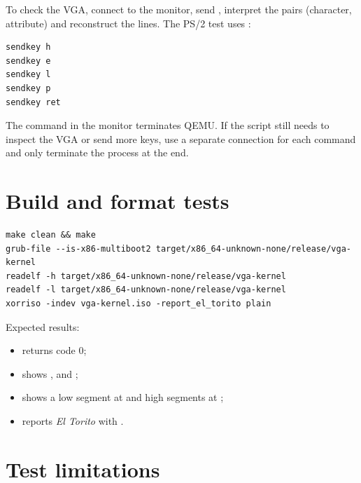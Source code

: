 To check the VGA, connect to the monitor, send
, interpret the pairs (character, attribute) and
reconstruct the lines. The PS/2 test uses :

\begin{lstlisting}[style=shell,caption={Sending keys through the QEMU monitor.},label={lst:sendkey}]
sendkey h
sendkey e
sendkey l
sendkey p
sendkey ret
\end{lstlisting}

\begin{atencao}
The  command in the monitor terminates QEMU. If the script still
needs to inspect the VGA or send more keys, use a separate connection for each
command and only terminate the process at the end.
\end{atencao}

\section{Build and format tests}

\begin{lstlisting}[style=shell,caption={Structural validation commands.},label={lst:testbuild}]
make clean && make
grub-file --is-x86-multiboot2 target/x86_64-unknown-none/release/vga-kernel
readelf -h target/x86_64-unknown-none/release/vga-kernel
readelf -l target/x86_64-unknown-none/release/vga-kernel
xorriso -indev vga-kernel.iso -report_el_torito plain
\end{lstlisting}

Expected results:

\begin{itemize}
  \item {} returns code 0;
  \item {} shows ,  and ;
  \item {} shows a low segment at  and
        high segments at ;
  \item {} reports \emph{El Torito} with
        .
\end{itemize}

\section{Test limitations}

